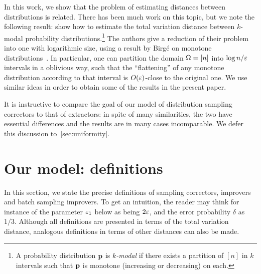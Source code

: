 In this work, we show that the problem of estimating distances
between distributions is related. There has been much work on this
topic, but we note the following result:
\cite{DDSVV:13} show how to estimate the total 
variation distance between $k$-modal probability distributions.\footnote{A probability distribution $\mathbf{p}$ is \emph{$k$-modal} if there exists a partition of $[n]$ in $k$ intervals such that $\mathbf{p}$ is monotone (increasing or decreasing) on each.}
The authors give a reduction of their problem into one with logarithmic size, 
using a result by Birg\'e on monotone distributions~\cite{Birge:87}. In particular, 
one can partition the domain ${\Omega}=[n]$ into $\log n/\varepsilon$ intervals in a oblivious way, 
such that the ``flattening'' of any monotone distribution according 
to that interval is $\bigO{\eps}$-close to the original one. 
We use similar ideas in order to obtain some of the results in the present paper. 

    


It is instructive to compare the goal of our model of distribution sampling correctors to that of extractors: in spite of many similarities, the two have essential differences and the results are in many cases incomparable. We defer this discussion to~\cref{sec:uniformity}.

\section{Our model: definitions}\label{sec:definitions}
	In this section, we state the precise definitions of sampling correctors, improvers and batch sampling improvers. 
To get an intuition, 
the reader may think for instance of the parameter $\varepsilon_1$ below as being $2\varepsilon$, 
and the error probability $\delta$ as $1/3$.
Although all definitions are presented in terms of the total variation
distance, analogous definitions in terms of other distances can also be made.

